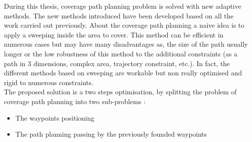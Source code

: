 %


During this thesis, coverage path planning problem is solved with new adaptive methods. The new methods introduced have been developed based on all the work carried out previously. 
About the coverage path planning a naive idea is to apply a sweeping inside the area to cover. This method can be efficient in numerous cases but may have many disadvantages as, the size of the path usually longer
or the low robustness of this method to the additional constraints (as a path in 3 dimensions, complex area, trajectory constraint, etc.). In fact, the different methods based on sweeping are workable but non really optimised and rigid to numerous constraints. \\
The proposed solution is a two steps optimisation, by splitting the problem of coverage path planning into two sub-problems : 
\begin{itemize}
\item The waypoints positioning 
\item The path planning passing by the previously founded waypoints
\end{itemize} 
